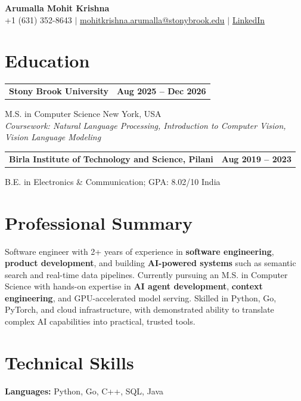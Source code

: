 \documentclass[letterpaper,10pt]{article}
\makeatletter
\newcommand{\entry}[2]{%
  \noindent
  \begin{tabularx}{\linewidth}
    {@{}>{\raggedright\arraybackslash}X@{\hspace{6pt}}r@{}}
    \textbf{#1} & #2
  \end{tabularx}\par
}
\makeatother
\begin{document}
\begin{center}
    {\LARGE\bfseries Arumalla Mohit Krishna}\\[3pt]
    +1 (631) 352-8643 $|$
    \href{mailto:mohitkrishna.arumalla@stonybrook.edu}
    {mohitkrishna.arumalla@stonybrook.edu} $|$
    \href{https://linkedin.com/in/mohit-krishna-arumalla}
    {LinkedIn}
\end{center}
\vspace{-8pt}

\section{Education}

\entry
  {\textbf{Stony Brook University}}
  {\textbf{Aug 2025 -- Dec 2026}}

M.S. in Computer Science \hfill New York, USA\\
\textit{
Coursework: Natural Language Processing,
Introduction to Computer Vision, Vision Language Modeling
}
\vspace{3pt}

\entry
  {\textbf{Birla Institute of Technology and Science, Pilani}}
  {\textbf{Aug 2019 -- 2023}}

B.E. in Electronics \& Communication; GPA: 8.02/10 \hfill India
\section{Professional Summary}

Software engineer with 2+ years of experience in \textbf{software engineering}, \textbf{product development}, and building \textbf{AI-powered systems} such as semantic search and real-time data pipelines. Currently pursuing an M.S. in Computer Science with hands-on expertise in \textbf{AI agent development}, \textbf{context engineering}, and GPU-accelerated model serving. Skilled in Python, Go, PyTorch, and cloud infrastructure, with demonstrated ability to translate complex AI capabilities into practical, trusted tools.

\section{Technical Skills}

\textbf{Languages:}
Python, Go, C++, SQL, Java\\
\end{document}
